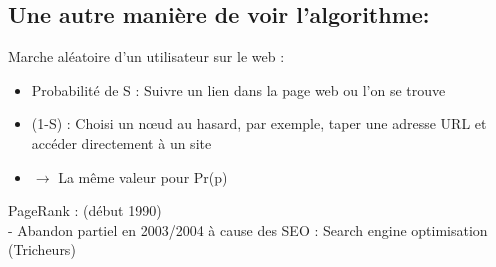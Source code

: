 \subsection*{ Une autre manière de voir l'algorithme:}
        Marche aléatoire d'un utilisateur sur le web : 
	\begin{itemize}
        \item Probabilité de S : Suivre un lien dans la page web ou l'on se trouve \\
        \item (1-S) : Choisi un n\oe ud au hasard, par exemple, taper une adresse URL et accéder directement à un site \\
        \item $\rightarrow $ La même valeur pour Pr(p) \\
	\end{itemize}
        PageRank : (début 1990) \\
        - Abandon partiel en 2003/2004 à cause des SEO : Search engine optimisation (Tricheurs)

